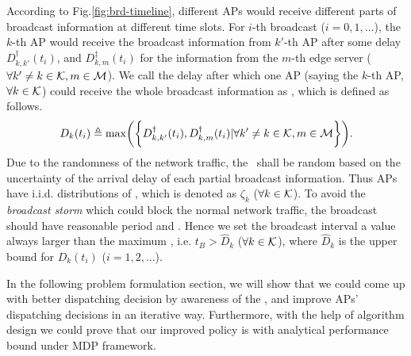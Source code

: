 According to Fig.\ref{fig:brd-timeline}, different APs would receive different parts of broadcast information at different time slots.
For $i$-th broadcast ($i=0,1,\dots$), the $k$-th AP would receive the broadcast information from $k'$-th AP after some delay $D^{\dagger}_{k,k'}(t_{i})$, and $D^{\ddagger}_{k,m}(t_{i})$ for the information from the $m$-th edge server ($\forall k' \neq k \in\mathcal{K}, m\in\mathcal{M}$).
We call the delay after which one AP (saying the $k$-th AP, $\forall k\in\mathcal{K}$) could receive the whole broadcast information as \brdelay, which is defined as follows.
\begin{align}
    D_{k}(t_{i}) \define \max\Paren{\Brace{
        D^{\dagger}_{k,k'}(t_{i}),
        D^{\dagger}_{k,m}(t_{i}) | \forall k' \neq k \in \apSet, m\in\esSet
    }}.
\end{align}
Due to the randomness of the network traffic, the \brdelay~shall be random based on the uncertainty of the arrival delay of each partial broadcast information.
Thus APs have i.i.d. distributions of \brdelay, which is denoted as $\zeta_{k}$ ($\forall k \in \mathcal{K}$).
To avoid the \emph{broadcast storm} which could block the normal network traffic, the broadcast should have reasonable period and .
Hence we set the broadcast interval a value always larger than the maximum \brdelay, i.e. $t_B > \hat{D}_k$ ($\forall k\in\mathcal{K}$), where $\hat{D}_k$ is the upper bound for $D_{k}(t_{i})$ ($i=1,2,\dots$).


In the following problem formulation section, we will show that we could come up with better dispatching decision by awareness of the \brdelay, and improve APs' dispatching decisions in an iterative way.
Furthermore, with the help of algorithm design we could prove that our improved policy is with analytical performance bound under MDP framework.

